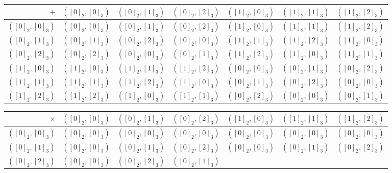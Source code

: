 \documentclass{article}
\begin{document}
\begin{enumerate}
			\begin{center}
				\renewcommand\arraystretch{1.3}
				\setlength\doublerulesep{0pt}
				\begin{tabular}{r || *{6}{c|} }
								 $+$ & $([0]_2, [0]_3)$ & $([0]_2, [1]_3)$ & $([0]_2, [2]_3)$ & 
								 $([1]_2, [0]_3)$ & $([1]_2, [1]_3)$ & $([1]_2, [2]_3)$ \\[0.3pt]
								 \hline\hline
					$([0]_2, [0]_3)$ & $([0]_2, [0]_3)$ & $([0]_2, [1]_3)$ & $([0]_2, [2]_3)$ & 
					$([1]_2, [0]_3)$ & $([1]_2, [1]_3)$ & $([1]_2, [2]_3)$ \\[0.3pt]\hline
					$([0]_2, [1]_3)$ & $([0]_2, [1]_3)$ & $([0]_2, [2]_3)$ & $([0]_2, [0]_3)$ & 
					$([1]_2, [1]_3)$ & $([1]_2, [2]_3)$ & $([1]_2, [0]_3)$ \\[0.3pt]\hline
					$([0]_2, [2]_3)$ & $([0]_2, [2]_3)$ & $([0]_2, [0]_3)$ & $([0]_2, [1]_3)$ & 
					$([1]_2, [2]_3)$ & $([1]_2, [0]_3)$ & $([1]_2, [1]_3)$ \\[0.3pt]\hline
					$([1]_2, [0]_3)$ & $([1]_2, [0]_3)$ & $([1]_2, [1]_3)$ & $([1]_2, [2]_3)$ & 
					$([0]_2, [0]_3)$ & $([0]_2, [1]_3)$ & $([0]_2, [2]_3)$ \\[0.3pt]\hline
					$([1]_2, [1]_3)$ & $([1]_2, [1]_3)$ & $([1]_2, [2]_3)$ & $([1]_2, [0]_3)$ & 
					$([0]_2, [1]_3)$ & $([0]_2, [2]_3)$ & $([0]_2, [0]_3)$ \\[0.3pt]\hline
					$([1]_2, [2]_3)$ & $([1]_2, [2]_3)$ & $([1]_2, [0]_3)$ & $([1]_2, [1]_3)$ & 
					$([0]_2, [2]_3)$ & $([0]_2, [0]_3)$ & $([0]_2, [1]_3)$ \\[0.3pt]\hline
				\end{tabular}
			\end{center}
			\begin{center}
				\renewcommand\arraystretch{1.3}
				\setlength\doublerulesep{0pt}
				\begin{tabular}{r || *{6}{c|} }
							$\times$ & $([0]_2, [0]_3)$ & $([0]_2, [1]_3)$ & $([0]_2, [2]_3)$ & 
							$([1]_2, [0]_3)$ & $([1]_2, [1]_3)$ & $([1]_2, [2]_3)$ \\[0.3pt]
							\hline\hline
					$([0]_2, [0]_3)$ & $([0]_2, [0]_3)$ & $([0]_2, [0]_3)$ & $([0]_2, [0]_3)$ & 
					$([0]_2, [0]_3)$ & $([0]_2, [0]_3)$ & $([0]_2, [0]_3)$ \\[0.3pt]\hline
					$([0]_2, [1]_3)$ & $([0]_2, [0]_3)$ & $([0]_2, [1]_3)$ & $([0]_2, [2]_3)$ & 
					$([0]_2, [0]_3)$ & $([0]_2, [1]_3)$ & $([0]_2, [2]_3)$ \\[0.3pt]\hline
					$([0]_2, [2]_3)$ & $([0]_2, [0]_3)$ & $([0]_2, [2]_3)$ & $([0]_2, [1]_3)$ & 

\end{tabular}
\end{center}
\end{enumerate}
\end{document}

